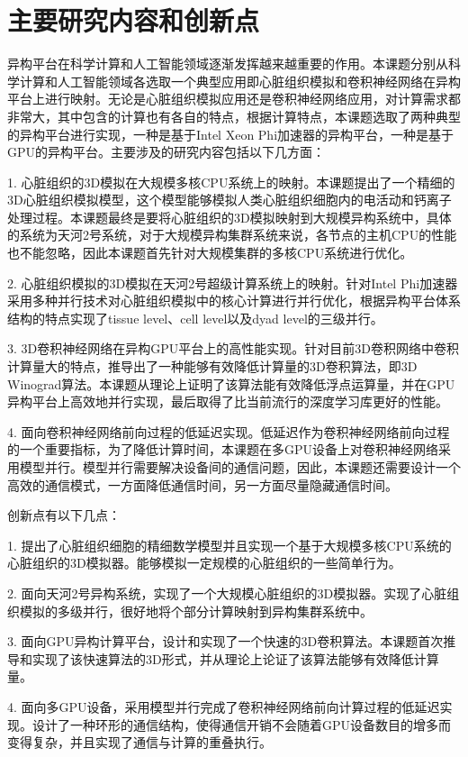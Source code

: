 \section{主要研究内容和创新点}
异构平台在科学计算和人工智能领域逐渐发挥越来越重要的作用。本课题分别从科学计算和人工智能领域各选取一个典型应用即心脏组织模拟和卷积神经网络在异构平台上进行映射。无论是心脏组织模拟应用还是卷积神经网络应用，对计算需求都非常大，其中包含的计算也有各自的特点，根据计算特点，本课题选取了两种典型的异构平台进行实现，一种是基于Intel Xeon Phi加速器的异构平台，一种是基于GPU的异构平台。主要涉及的研究内容包括以下几方面：
\begin{compactitem}
\item[1.]心脏组织的3D模拟在大规模多核CPU系统上的映射。本课题提出了一个精细的3D心脏组织模拟模型，这个模型能够模拟人类心脏组织细胞内的电活动和钙离子处理过程。本课题最终是要将心脏组织的3D模拟映射到大规模异构系统中，具体的系统为天河2号系统，对于大规模异构集群系统来说，各节点的主机CPU的性能也不能忽略，因此本课题首先针对大规模集群的多核CPU系统进行优化。

\item[2.]心脏组织模拟的3D模拟在天河2号超级计算系统上的映射。针对Intel Phi加速器采用多种并行技术对心脏组织模拟中的核心计算进行并行优化，根据异构平台体系结构的特点实现了tissue level、cell level以及dyad level的三级并行。

\item[3.]3D卷积神经网络在异构GPU平台上的高性能实现。针对目前3D卷积网络中卷积计算量大的特点，推导出了一种能够有效降低计算量的3D卷积算法，即3D Winograd算法。本课题从理论上证明了该算法能有效降低浮点运算量，并在GPU异构平台上高效地并行实现，最后取得了比当前流行的深度学习库更好的性能。

\item[4.]面向卷积神经网络前向过程的低延迟实现。低延迟作为卷积神经网络前向过程的一个重要指标，为了降低计算时间，本课题在多GPU设备上对卷积神经网络采用模型并行。模型并行需要解决设备间的通信问题，因此，本课题还需要设计一个高效的通信模式，一方面降低通信时间，另一方面尽量隐藏通信时间。

\end{compactitem}

创新点有以下几点：
\begin{compactitem}
\item[1.]提出了心脏组织细胞的精细数学模型并且实现一个基于大规模多核CPU系统的心脏组织的3D模拟器。能够模拟一定规模的心脏组织的一些简单行为。

\item[2.]面向天河2号异构系统，实现了一个大规模心脏组织的3D模拟器。实现了心脏组织模拟的多级并行，很好地将个部分计算映射到异构集群系统中。

\item[3.]面向GPU异构计算平台，设计和实现了一个快速的3D卷积算法。本课题首次推导和实现了该快速算法的3D形式，并从理论上论证了该算法能够有效降低计算量。

\item[4.]面向多GPU设备，采用模型并行完成了卷积神经网络前向计算过程的低延迟实现。设计了一种环形的通信结构，使得通信开销不会随着GPU设备数目的增多而变得复杂，并且实现了通信与计算的重叠执行。

\end{compactitem}

